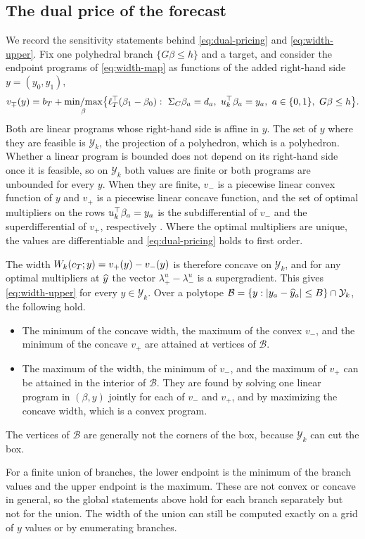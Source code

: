 \subsection{The dual price of the forecast}
\label{app:dual-price}

We record the sensitivity statements behind
\eqref{eq:dual-pricing} and \eqref{eq:width-upper}. Fix one polyhedral
branch $\{G\beta\leq h\}$ and a target, and consider the endpoint
programs of \eqref{eq:width-map} as functions of the added right-hand
side $y=(y_0,y_1)$,
\[
  v_\mp(y)=b_T+\operatorname*{min/max}_{\beta}\bigl\{\ell_T^\top(\beta_1-\beta_0):\
  \Sigma_C\beta_a=d_{a},\
  u_{k}^\top\beta_a=y_a,\ a\in\{0,1\},\ G\beta\leq h\bigr\}.
\]
Both are linear programs whose right-hand side is affine in $y$. The
set of $y$ where they are feasible is $\mathcal Y_k$, the projection of a
polyhedron, which is a polyhedron. Whether a linear program is bounded
does not depend on its right-hand side once it is feasible, so on
$\mathcal Y_k$ both values are finite or both programs are unbounded for
every $y$. When they are finite, $v_-$ is a piecewise linear convex
function of $y$ and $v_+$ is a piecewise linear concave function, and the
set of optimal multipliers on the rows $u_{k}^\top\beta_a=y_a$ is
the subdifferential of $v_-$ and the superdifferential of $v_+$,
respectively \citep[Chapter~4]{bonnans2013perturbation}. Where the
optimal multipliers are unique, the values are differentiable and
\eqref{eq:dual-pricing} holds to first order.

The width $W_k(c_T;y)=v_+(y)-v_-(y)$ is therefore concave on
$\mathcal Y_k$, and for any optimal multipliers at $\widehat{y}$ the vector
$\lambda^u_{+}-\lambda^u_{-}$ is a supergradient. This gives
\eqref{eq:width-upper} for every $y\in\mathcal Y_k$. Over a polytope
$\mathcal B=\{y:|y_a-\widehat{y}_a|\leq B\}\cap\mathcal Y_k$, the following
hold.
\begin{itemize}
\item The minimum of the concave width, the maximum of the convex $v_-$,
  and the minimum of the concave $v_+$ are attained at vertices of
  $\mathcal B$.
\item The maximum of the width, the minimum of $v_-$, and the maximum of
  $v_+$ can be attained in the interior of $\mathcal B$. They are found by
  solving one linear program in $(\beta,y)$ jointly for each of $v_-$ and
  $v_+$, and by maximizing the concave width, which is a convex program.
\end{itemize}
The vertices of $\mathcal B$ are generally not the corners of the box,
because $\mathcal Y_k$ can cut the box.

For a finite union of branches, the lower endpoint is the minimum of the
branch values and the upper endpoint is the maximum. These are not
convex or concave in general, so the global statements above hold for
each branch separately but not for the union. The width of the union
can still be computed exactly on a grid of $y$ values or by enumerating
branches.

